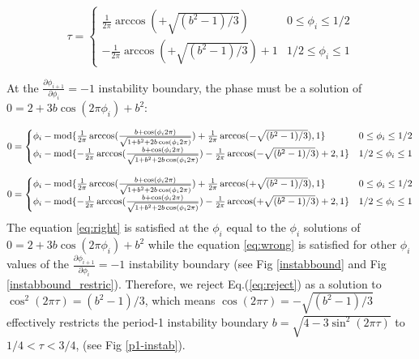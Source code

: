 \begin{equation} 
    \tau =
    \begin{cases}
        \frac{1}{2\pi}\arccos(+\sqrt{(b^2 - 1)/3}) & 0 \leq \phi_i \leq 1/2 \\
       -\frac{1}{2\pi}\arccos(+\sqrt{(b^2 - 1)/3}) + 1 & 1/2 \leq \phi_i \leq 1
    \end{cases}
    \label{eq:reject}
\end{equation} 

At the $\frac{\partial \phi_{i+1}}{\partial \phi_i} = -1$ instability boundary, the phase must be a solution of $0 = 2+3b\cos(2\pi \phi_i) + b^2$:

\begin{equation} 
    0 = 
    \begin{cases}
       \phi_i - \textnormal{mod} \{\frac{1}{2\pi}\arccos(\frac{b+\cos(\phi_i 2\pi)}{\sqrt{1+b^2+2b\cos(\phi_i 2\pi)}}) + \frac{1}{2\pi}\arccos(-\sqrt{(b^2 - 1)/3}),1\}& 0 \leq \phi_i \leq 1/2 \\
       \phi_i - \textnormal{mod} \{-\frac{1}{2\pi}\arccos(\frac{b+\cos(\phi_i 2\pi)}{\sqrt{1+b^2+2b\cos(\phi_i 2\pi)}})-\frac{1}{2\pi}\arccos(-\sqrt{(b^2 - 1)/3}) + 2,1\}& 1/2 \leq \phi_i \leq 1 \\
    \end{cases}
    \label{eq:right}
\end{equation} 

\begin{equation} 
    0 = 
    \begin{cases}
       \phi_i - \textnormal{mod} \{\frac{1}{2\pi}\arccos(\frac{b+\cos(\phi_i 2\pi)}{\sqrt{1+b^2+2b\cos(\phi_i 2\pi)}}) + \frac{1}{2\pi}\arccos(+\sqrt{(b^2 - 1)/3}),1\}& 0 \leq \phi_i \leq 1/2 \\
       \phi_i - \textnormal{mod} \{-\frac{1}{2\pi}\arccos(\frac{b+\cos(\phi_i 2\pi)}{\sqrt{1+b^2+2b\cos(\phi_i 2\pi)}})-\frac{1}{2\pi}\arccos(+\sqrt{(b^2 - 1)/3}) + 2,1\}& 1/2 \leq \phi_i \leq 1 \\
    \end{cases}
    \label{eq:wrong}
\end{equation} 
The equation \ref{eq:right} is satisfied at the $\phi_i$ equal to the $\phi_i$ solutions of $0 = 2+3b\cos(2\pi \phi_i) + b^2$ while the equation \ref{eq:wrong} is satisfied for other $\phi_i$ values of the $\frac{\partial \phi_{i+1}}{\partial \phi_i} = -1$ instability boundary (see Fig \ref{instabbound} and Fig \ref{instabbound_restric}). Therefore, we reject Eq.(\ref{eq:reject}) as a solution to $\cos^2(2\pi\tau) = (b^2 - 1)/3$, which means $\cos(2\pi\tau) = -\sqrt{(b^2 - 1)/3}$ effectively restricts the period-1 instability boundary $b = \sqrt{4-3\sin^2(2\pi\tau)}$ to $1/4<\tau<3/4$, (see Fig \ref{p1-instab}). 

